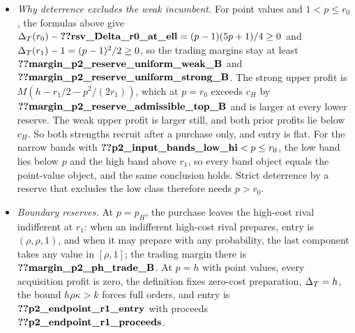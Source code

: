 \begin{itemize}[leftmargin=2em]
exceed their levels at the reserve \(\reg{prim_p}\) by \(\reg{margin_p2_reserve_points_rev0_B}\) and
\(\reg{margin_p2_reserve_points_rev1_B}\). The point values and the narrow bands give the same objects here, because the
reserve lies above the low band and below the high band. The strong upper profit equals \(c_H\) at
\(p_H=\sqrt{2r_1(h-c_H/M)-r_1^2}\approx\reg{p2_reserve_ph}\), and the weak upper profit equals \(c_H\) at
\(h-c_H/M\approx\reg{p2_reserve_weak_top}\); the reserve lies inside this interval, at distances
\(\reg{margin_p2_deter_lower_B}\) and \(\reg{margin_p2_deter_upper_B}\) from its ends, and \(p_H-r_0=\reg{margin_p2_ph_weak_B}\).
\item \emph{Why deterrence excludes the weak incumbent.} For point values and \(1<p\le r_0\), the formulas above give
\(\DT(r_0)-\reg{rsv_Delta_r0_at_ell}=(p-1)(5p+1)/4\ge0\) and \(\Delta_T(r_1)-1=(p-1)^2/2\ge0\), so the trading margins stay at least
\(\reg{margin_p2_reserve_uniform_weak_B}\) and \(\reg{margin_p2_reserve_uniform_strong_B}\). The strong upper profit is
\(M(h-r_1/2-p^2/(2r_1))\), which at \(p=r_0\) exceeds \(c_H\) by \(\reg{margin_p2_reserve_admissible_top_B}\) and is larger
at every lower reserve. The weak upper profit is larger still, and both prior profits lie below \(c_H\). So both
strengths recruit after a purchase only, and entry is flat. For the narrow bands with
\(\reg{p2_input_bands_low_hi}<p\le r_0\), the low band lies below \(p\) and the high band above \(r_1\), so every band object equals the
point-value object, and the same conclusion holds. Strict deterrence by a reserve that excludes the low class therefore
needs \(p>r_0\).
\item \emph{Boundary reserves.} At \(p=p_H\), the purchase leaves the high-cost rival indifferent at \(r_1\):
when an indifferent high-cost rival prepares, entry is \((\rho,\rho,1)\), and when it may prepare with any
probability, the last component takes any value in \([\rho,1]\); the trading margin there is
\(\reg{margin_p2_ph_trade_B}\). At \(p=h\) with point values, every acquisition profit is zero, the definition fixes
zero-cost preparation, \(\Delta_T=h\), the bound \(h\rho\kappa>k\) forces full orders, and entry is
\(\reg{p2_endpoint_r1_entry}\) with proceeds \(\reg{p2_endpoint_r1_proceeds}\).
\end{itemize}
